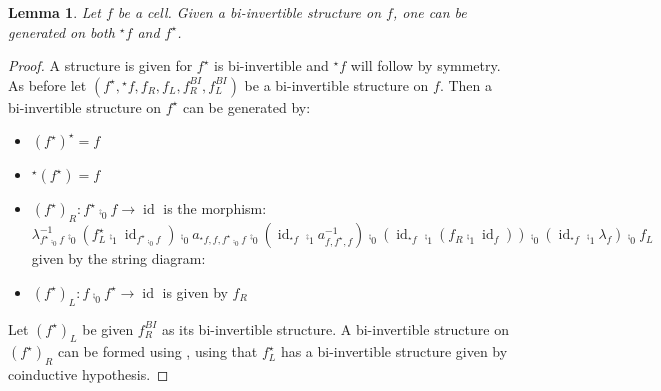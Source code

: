 \documentclass{article}
\newtheorem{lemma}[theorem]{Lemma} \theoremstyle{definition}
\DeclareMathOperator{\id}{id}
\newcommand{\linv}[1]{{}^\star\!#1} \newcommand{\rinv}[1]{#1^\star}
\begin{document}
\begin{lemma}\label{inverses}
  Let \(f\) be a cell. Given a bi-invertible structure on \(f\), one
  can be generated on both \(\linv f\) and \(\rinv f\).
\end{lemma}
\begin{proof}
  A structure is given for \(\rinv f\) is bi-invertible and \(\linv
  f\) will follow by symmetry. As before let \((\rinv f, \linv f, f_R,
  f_L, f_R^{BI}, f_L^{BI})\) be a bi-invertible structure on \(f\).
  Then a bi-invertible structure on \(\rinv f\) can be generated by:
  \begin{itemize}
  \item \(\rinv {(\rinv f)} = f\)
  \item \(\linv {(\rinv f)} = f\)
  \item \({(\rinv f)}_R: \rinv f \comp_0 f \to \id\) is the morphism:
    \begin{equation*}
      \lambda_{\rinv f \comp_0 f}^{-1} \comp_0 (\rinv {f_L} \comp_1 \id_{\rinv f \comp_0 f}) \comp_0 a_{\linv f, f, \rinv f \comp_0 f} \comp_0 (\id_{\linv f} \comp_1 a_{f, \rinv f, f}^{-1}) \comp_0 (\id_{\linv f} \comp_1 (f_R \comp_1 \id_f)) \comp_0 (\id_{\linv f} \comp_1 \lambda_f) \comp_0 f_L
    \end{equation*}
    given by the string diagram:
    \begin{center}
    \end{center}
  \item \({(\rinv f)}_L: f \comp_0 \rinv f \to \id\) is given by
    \(f_R\)
  \end{itemize}
  Let \({(\rinv f)}_L\) be given \(f_R^{BI}\) as its bi-invertible
  structure. A bi-invertible structure on \({(\rinv f)}_R\) can be
  formed using , using that \(\rinv {f_L}\)
  has a bi-invertible structure given by coinductive hypothesis.
\end{proof}
\end{document}
